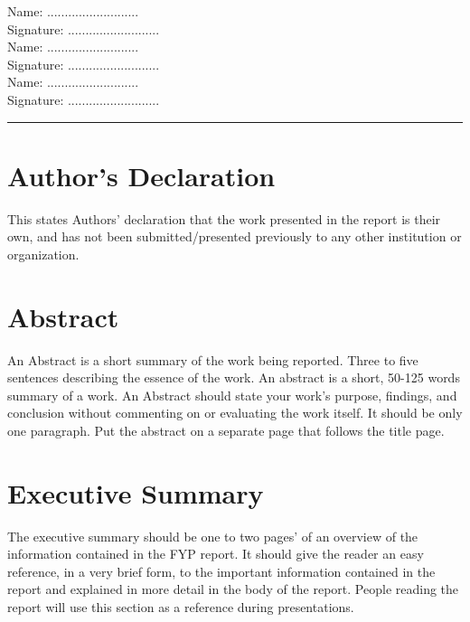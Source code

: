 \documentclass{FastFyp}
\begin{document}
\begin{flushright}
Name: ..........................
\\[3ex]
Signature: ..........................
\\[6ex]
Name: ..........................
\\[3ex]
Signature: ..........................
\\[6ex]
Name: ..........................
\\[3ex]
Signature: ..........................

\end{flushright} 

\vspace{5 cm} %
 
\hrule %

\section*{Author's Declaration}
This states Authors’ declaration that the work presented in the report is their own, and has not been submitted/presented previously to any other institution or organization.
\pagebreak
\section*{Abstract}
An Abstract is a short summary of the work being reported. Three to five sentences describing the essence of the work. An abstract is a short, 50-125 words summary of a work. An Abstract should state your work's purpose, findings, and conclusion without commenting on or evaluating the work itself.  It should be only one paragraph. Put the abstract on a separate page that follows the title page.
\pagebreak 

\section*{Executive Summary}
The executive summary should be one to two pages’ of an overview of the information contained in the FYP report.  It should give the reader an easy reference, in a very brief form, to the important information contained in the report and explained in more detail in the body of the report. People reading the report will use this section as a reference during presentations. 
\pagebreak


\pagestyle{fancy} %
\tableofcontents

\pagebreak
\listoffigures	%
\pagebreak
\listoftables %
\end{document}
